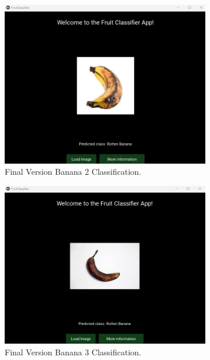 \documentclass[conference]{IEEEtran}
\begin{document}
\begin{figure}[h]
\begin{subfigure}[b]{0.48\linewidth}
        \centering
        \includegraphics[width=\linewidth]{Mlayer bananaR2.png}
        \caption{Final Version Banana 2 Classification.}
        \label{figFB}
    \end{subfigure}
    \hfill
    \begin{subfigure}[b]{0.48\linewidth}
        \centering
        \includegraphics[width=\linewidth]{Mlayer bananaR3.png}
        \caption{Final Version Banana 3 Classification.}
        \label{figFB}
    \end{subfigure}
    \hfill
    \begin{subfigure}[b]{0.48\linewidth}
        \centering

\end{subfigure}
\end{figure}
\end{document}
